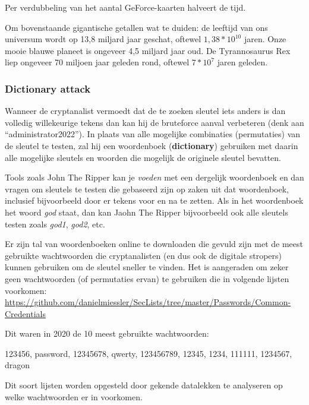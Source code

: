 \documentclass[
  10pt,
  dutch,
  paper=a4,
  ,captions=tableheading
]{scrbook}
\begin{document}
\begin{tipblock}
Per verdubbeling van het aantal GeForce-kaarten halveert de tijd.
\end{tipblock}

\begin{noteblock}
Om bovenstaande gigantische getallen wat te duiden: de leeftijd van ons
universum wordt op 13,8 miljard jaar geschat, oftewel \(1,38*10^{10}\)
jaren. Onze mooie blauwe planeet is ongeveer 4,5 miljard jaar oud. De
Tyrannosaurus Rex liep ongeveer 70 miljoen jaar geleden rond, oftewel
\(7*10^{7}\) jaren geleden.
\end{noteblock}

\subsubsection{Dictionary attack}\label{dictionary-attack}

Wanneer de cryptanalist vermoedt dat de te zoeken sleutel iets anders is
dan volledig willekeurige tekens dan kan hij de bruteforce aanval
verbeteren (denk aan ``administrator2022''). In plaats van alle
mogelijke combinaties (permutaties) van de sleutel te testen, zal hij
een woordenboek (\textbf{dictionary}) gebruiken met daarin alle
mogelijke sleutels en woorden die mogelijk de originele sleutel
bevatten.

Tools zoals John The Ripper kan je \emph{voeden} met een dergelijk
woordenboek en dan vragen om sleutels te testen die gebaseerd zijn op
zaken uit dat woordenboek, inclusief bijvoorbeeld door er tekens voor en
na te zetten. Als in het woordenboek het woord \emph{god} staat, dan kan
Jaohn The Ripper bijvoorbeeld ook alle sleutels testen zoals
\emph{god1}, \emph{god2}, etc.

Er zijn tal van woordenboeken online te downloaden die gevuld zijn met
de meest gebruikte wachtwoorden die cryptanalisten (en dus ook de
digitale stropers) kunnen gebruiken om de sleutel sneller te vinden. Het
is aangeraden om zeker geen wachtwoorden (of permutaties ervan) te
gebruiken die in volgende lijsten voorkomen:
\url{https://github.com/danielmiessler/SecLists/tree/master/Passwords/Common-Credentials}

\begin{tipblock}
Dit waren in 2020 de 10 meest gebruikte wachtwoorden:

123456, password, 12345678, qwerty, 123456789, 12345, 1234, 111111,
1234567, dragon

Dit soort lijsten worden opgesteld door gekende datalekken te analyseren
op welke wachtwoorden er in voorkomen.
\end{tipblock}
\end{document}
